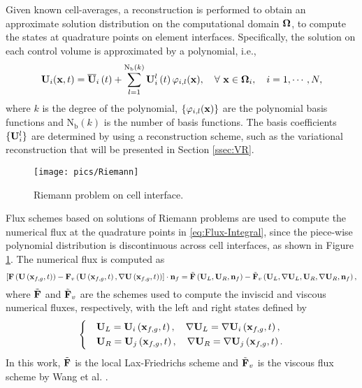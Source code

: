 Given known cell-averages, a reconstruction is performed to obtain an approximate solution distribution on the computational domain $\mathbf{\Omega}$, to compute the states at quadrature points on element interfaces. Specifically, the solution on each control volume is approximated by a polynomial, i.e.,
\begin{equation}
    \label{eq:FVRec}
    \mathbf{U}_i(\mathbf{x},t) = \overline{\mathbf{U}}_i \left(t\right) + \sum_{l=1}^{\mathrm{N_b}(k)}{\mathbf{U}_i^l \left(t\right) \varphi_{i,l}(\mathbf{x}) }, \quad \forall \ \mathbf{x} \in \mathbf{\Omega}_i, \quad i=1, \cdots, N,
\end{equation}
where $k$ is the degree of the polynomial, $\{\varphi_{i,l}(\mathbf{x})\}$ are the polynomial basis functions and $\mathrm{N_b}(k)$ is the number of basis functions. The basis coefficients $\{\mathbf{U}^l_i\}$ are determined by using a reconstruction scheme, such as the variational reconstruction \cite{wang2017compact_VR} that will be presented in Section \ref{ssec:VR}.

\begin{figure}[htbp!]
    \centering
    \texttt{[image: pics/Riemann]}
    \caption{Riemann problem on cell interface.}
    \label{fig:Riemann}
\end{figure}

Flux schemes based on solutions of Riemann problems are used to compute the numerical flux at the quadrature points in \eqref{eq:Flux-Integral}, since the piece-wise polynomial distribution is discontinuous across cell interfaces, as shown in Figure \ref{fig:Riemann}.
The numerical flux is computed as
\begin{equation}
    \label{eq:num-flux}
    \left[\mathbf{F} \left(\mathbf{U} \left(\mathbf{x}_{f,g},t\right)\right) - \mathbf{F}_v \left(\mathbf{U}\left(\mathbf{x}_{f,g},t\right), \nabla \mathbf{U} \left(\mathbf{x}_{f,g},t\right)\right)\right] \cdot \mathbf{n}_f = \tilde{\mathbf{F}} \left(\mathbf{U}_L, \mathbf{U}_R,\mathbf{n}_f\right)- \tilde{\mathbf{F}}_v \left(\mathbf{U}_L, \nabla \mathbf{U}_L, \mathbf{U}_R, \nabla \mathbf{U}_R, \mathbf{n}_f\right),
\end{equation}
where $\tilde{\mathbf{F}}$ and $\tilde{\mathbf{F}}_v$ are the schemes used to compute the inviscid and viscous numerical fluxes, respectively, with the left and right states defined by
\begin{equation}
    \begin{dcases}
         & \mathbf{U}_L= \mathbf{U}_i\left(\mathbf{x}_{f,g},t \right), \quad \nabla \mathbf{U}_L= \nabla \mathbf{U}_i\left(\mathbf{x}_{f,g},t \right),  \\
         & \mathbf{U}_R= \mathbf{U}_j\left(\mathbf{x}_{f,g} ,t \right), \quad \nabla \mathbf{U}_R= \nabla \mathbf{U}_j\left(\mathbf{x}_{f,g},t \right).
    \end{dcases}
\end{equation}
In this work, $\tilde{\mathbf{F}}$ is the local Lax-Friedrichs scheme and $\tilde{\mathbf{F}}_v$ is the viscous flux scheme by Wang et al. \cite{wang2017compact_VR}.

